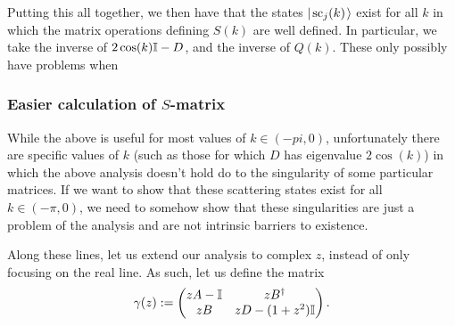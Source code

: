 \documentclass[../thesis-main/thesis-main]{subfiles}
\begin{document}
Putting this all together, we then have that the states $|\mspace{2mu} \text{sc}_j(k) \mspace{2mu} \rangle$ exist for all $k$ in which the matrix operations defining $S(k)$ are well defined.  In particular, we take the inverse of $2\cos(k)\mathbb{I} - D$, and the inverse of $Q(k)$.  These only possibly have problems when 

\subsubsection{Easier calculation of $S$-matrix}


While the above is useful for most values of $k\in(-pi,0)$, unfortunately there are specific values of $k$ (such as those for which $D$ has eigenvalue $2\cos(k)$) in which the above analysis doesn't hold do to the singularity of some particular matrices.  If we want to show that these scattering states exist for all $k\in (-\pi,0)$, we need to somehow show that these singularities are just a problem of the analysis and are not intrinsic barriers to existence.

Along these lines, let us extend our analysis to complex $z$, instead of only focusing on the real line.  As such, let us define the matrix
\begin{equation}
  \gamma(z) := \begin{pmatrix}  z A - \mathbb{I} & z B^\dag\\
    z B & zD - (1+z^2) \mathbb{I}\end{pmatrix}.
    \label{eq:gamma_def}
\end{equation}
\end{document}
